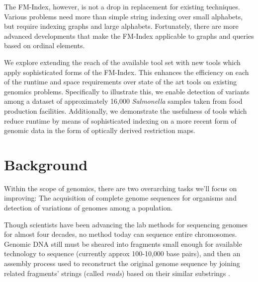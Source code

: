 The FM-Index, however, is not a drop in replacement for existing techniques. Various problems need more than simple string indexing over small alphabets, but require indexing graphs and large alphabets.  Fortunately, there are more advanced developments that make the FM-Index applicable to graphs and queries based on ordinal elements.

We explore extending the reach of the available tool set with new tools which apply sophisticated forms of the FM-Index.  This enhances the efficiency on each of the runtime and space requirements over state of the art tools on existing genomics problems.  
Specifically to illustrate this, we enable detection of variants among a dataset of approximately 16,000 \emph{Salmonella} samples taken from food production facilities.  Additionally, we demonstrate the usefulness of tools which reduce runtime by means of sophisticated indexing on a more recent form of genomic data in the form of optically derived restriction maps.



\section{Background}

Within the scope of genomics, there are two overarching tasks we'll focus on improving: The acquisition of complete genome sequences for organisms and detection of variations of genomes among a population.

Though scientists have been advancing the lab methods for sequencing genomes for almost four decades, no method today can sequence entire chromosomes. Genomic DNA still must  be sheared into fragments small enough for available technology to sequence (currently approx 100-10,000 base pairs), and then an assembly process used to reconstruct the original genome sequence by joining related fragments' strings (called \emph{reads}) based on their similar substrings \cite{nagarajan2013sequence,staden1980new}.

